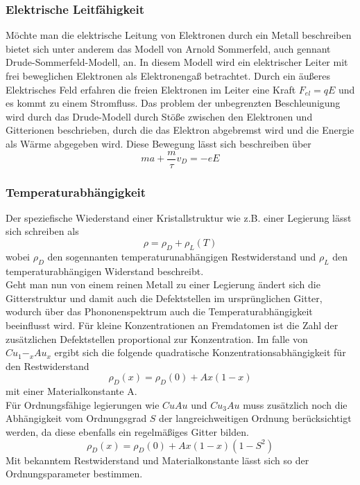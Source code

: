         \subsubsection{Elektrische Leitfähigkeit}
            Möchte man die elektrische Leitung von Elektronen durch ein Metall beschreiben bietet sich unter
            anderem das Modell von Arnold Sommerfeld, auch gennant Drude-Sommerfeld-Modell, an. In diesem Modell
            wird ein elektrischer Leiter mit frei beweglichen Elektronen als Elektronengaß betrachtet.
            Durch ein äußeres Elektrisches Feld erfahren die freien Elektronen im Leiter eine Kraft $F_{el} = qE$
            und es kommt zu einem Stromfluss. Das problem der unbegrenzten Beschleunigung wird durch das Drude-Modell
            durch Stöße zwischen den Elektronen und Gitterionen beschrieben, durch die das Elektron abgebremst wird
            und die Energie als Wärme abgegeben wird. Diese Bewegung lässt sich beschreiben über
            \begin{equation}
                ma + \frac{m}{\tau}v_D = -eE
            \end{equation}  

        \subsubsection{Temperaturabhängigkeit}
            Der speziefische Wiederstand einer Kristallstruktur wie z.B. einer Legierung lässt sich schreiben als
            \begin{equation}
                \rho = \rho_D + \rho_L(T)
            \end{equation}
            wobei $\rho_D$ den sogennanten temperaturunabhängigen Restwiderstand und $\rho_L$ den temperaturabhängigen
            Widerstand beschreibt.\\
            Geht man nun von einem reinen Metall zu einer Legierung ändert sich die Gitterstruktur und 
            damit auch die Defektstellen im ursprünglichen Gitter, wodurch über das Phononenspektrum auch
            die Temperaturabhängigkeit beeinflusst wird. Für kleine Konzentrationen an Fremdatomen ist die
            Zahl der zusätzlichen Defektstellen proportional zur Konzentration. Im falle von $Cu_1-_xAu_x$ ergibt sich
            die folgende quadratische Konzentrationsabhängigkeit für den Restwiderstand
            \begin{equation}
                \rho_D(x) = \rho_D(0)+Ax(1-x)
            \end{equation}  
            mit einer Materialkonstante A.\\
            Für Ordnungsfähige legierungen wie $CuAu$ und $Cu_3Au$ muss zusätzlich noch die Abhängigkeit vom
            Ordnungsgrad $S$ der langreichweitigen Ordnung berücksichtigt werden, da diese ebenfalls ein regelmäßiges
            Gitter bilden.
            \begin{equation}
                \rho_D(x) = \rho_D(0)+Ax(1-x)(1-S^2)
            \end{equation}
            Mit bekanntem Restwiderstand und Materialkonstante lässt sich so der Ordnungsparameter bestimmen.
        
